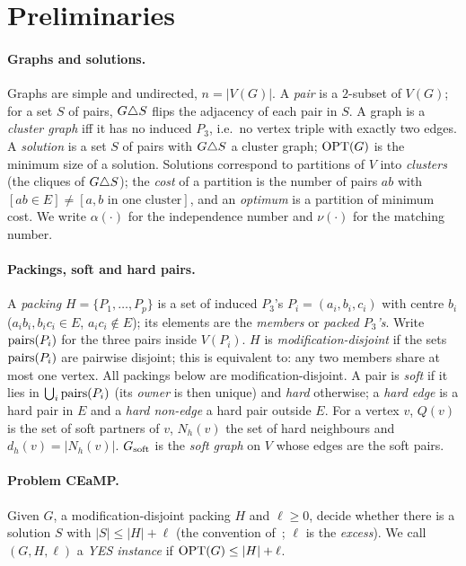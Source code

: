 \section{Preliminaries}\label{sec:prelim}
\paragraph{Graphs and solutions.}
Graphs are simple and undirected, $n=|V(G)|$. A \emph{pair} is a $2$-subset of $V(G)$; for a set $S$ of pairs, $G\triangle S$ flips the adjacency of each pair in $S$. A graph is a \emph{cluster graph} iff it has no induced $P_3$, i.e.\ no vertex triple with exactly two edges. A \emph{solution} is a set $S$ of pairs with $G\triangle S$ a cluster graph; $\mathrm{OPT}(G)$ is the minimum size of a solution. Solutions correspond to partitions of $V$ into \emph{clusters} (the cliques of $G\triangle S$); the \emph{cost} of a partition is the number of pairs $ab$ with $[ab\in E]\ne[a,b\text{ in one cluster}]$, and an \emph{optimum} is a partition of minimum cost. We write $\alpha(\cdot)$ for the independence number and $\nu(\cdot)$ for the matching number.

\paragraph{Packings, soft and hard pairs.}
A \emph{packing} $H=\{P_1,\dots,P_p\}$ is a set of induced $P_3$'s $P_i=(a_i,b_i,c_i)$ with centre $b_i$ ($a_ib_i,b_ic_i\in E$, $a_ic_i\notin E$); its elements are the \emph{members} or \emph{packed $P_3$'s}. Write $\mathrm{pairs}(P_i)$ for the three pairs inside $V(P_i)$. $H$ is \emph{modification-disjoint} if the sets $\mathrm{pairs}(P_i)$ are pairwise disjoint; this is equivalent to: any two members share at most one vertex. All packings below are modification-disjoint. A pair is \emph{soft} if it lies in $\bigcup_i\mathrm{pairs}(P_i)$ (its \emph{owner} is then unique) and \emph{hard} otherwise; a \emph{hard edge} is a hard pair in $E$ and a \emph{hard non-edge} a hard pair outside $E$. For a vertex $v$, $Q(v)$ is the set of soft partners of $v$, $N_h(v)$ the set of hard neighbours and $d_h(v)=|N_h(v)|$. $G_{\mathrm{soft}}$ is the \emph{soft graph} on $V$ whose edges are the soft pairs.

\paragraph{Problem CEaMP.}
Given $G$, a modification-disjoint packing $H$ and $\ell\ge 0$, decide whether there is a solution $S$ with $|S|\le |H|+\ell$ (the convention of~\cite{LPS23}; $\ell$ is the \emph{excess}). We call $(G,H,\ell)$ a \emph{YES instance} if $\mathrm{OPT}(G)\le|H|+\ell$.

